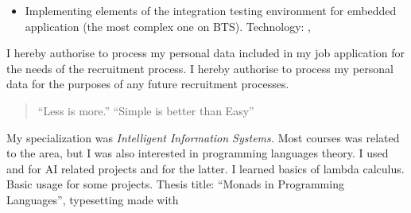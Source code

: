 \documentclass[10pt,a4paper,ragged2e,withhyper]{altacv}
\newcommand{\CompanyName}{\hspace{4.5em}}
\begin{document}
\begin{paracol}{2}
\medskip

\begin{itemize}
\item 
  Implementing elements of the integration testing environment for embedded
  application (the most complex one on BTS). Technology:   
     ,  
\end{itemize}

\medskip

{\tiny I hereby authorise \CompanyName to process my personal data included in my job application for the needs of the recruitment process. I hereby authorise \CompanyName to process my personal data for the purposes of any future recruitment processes.}

\newpage

\switchcolumn


\begin{quote}
``Less is more.''
``Simple is better than Easy''
\end{quote}


\divider


\medskip


  My specialization was \textit{Intelligent Information Systems.} Most courses was
  related to the area, but I was also interested in programming languages
  theory. I used    and  for AI related projects and 
  for the latter. I learned basics of lambda calculus. Basic usage  for
  some projects. Thesis title: “Monads in Programming Languages”,
  typesetting made with 


\end{paracol}
\end{document}
